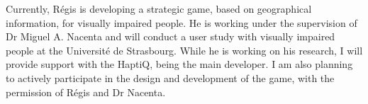 Currently, Régis is developing a strategic game, based on geographical information, for visually impaired people. He is working under the supervision of Dr Miguel A. Nacenta and will conduct a user study with visually impaired people at the Université de Strasbourg. While he is working on his research, I will provide support with the HaptiQ, being the main developer. I am also planning to actively participate in the design and development of the game, with the permission of Régis and Dr Nacenta. 